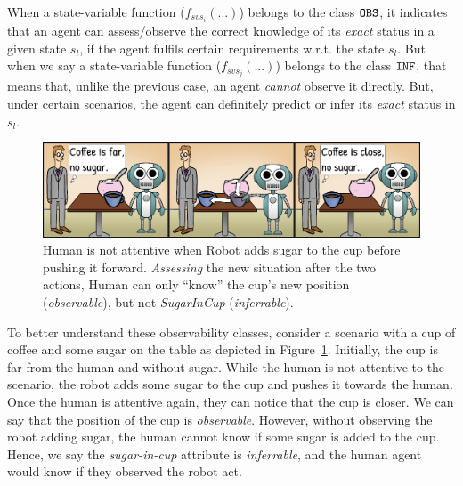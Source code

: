 \documentclass[letterpaper]{article} %
\begin{document}

When a state-variable function ($f_{svs_i}(...)$) belongs to the class $\texttt{OBS}$, it indicates that an agent can assess/observe the correct knowledge of its \textit{exact} status in a given state $s_l$, if the agent fulfils certain requirements w.r.t. the state $s_l$. 
But when we say a state-variable function ($f_{svs_j}(...)$) belongs to the class $\texttt{INF}$, that means that, unlike the previous case, an agent \textit{cannot} observe it directly. But, under certain scenarios, the agent can definitely predict or infer its \textit{exact} status in $s_l$. 

\begin{figure}
    \centering
    \includegraphics[width=1.0\linewidth]{figures/cartoon_inf_obs_bigger.png}
    \caption{
    Human is not attentive when Robot adds sugar to the cup before pushing it forward. \textit{Assessing} the new situation after the two actions, Human can only ``know'' the cup's new position (\textit{observable}), but not \textit{SugarInCup} (\textit{inferrable}).
    }
    \label{fig:obs_attr}
\end{figure}


To better understand these observability classes, consider a scenario with a cup of coffee and some sugar on the table as depicted in Figure~\ref{fig:obs_attr}. 
Initially, the cup is far from the human and without sugar. While the human is not attentive to the scenario, the robot adds some sugar to the cup and pushes it towards the human. 
Once the human is attentive again, they
can notice that the cup is closer. We can say that the position of the cup is \textit{observable}.
However, without observing the robot adding sugar, the human cannot know if some sugar is added to the cup. Hence, we say the \textit{sugar-in-cup} attribute is \textit{inferrable}, 
and the human agent would know if they observed the robot act.
\end{document}
